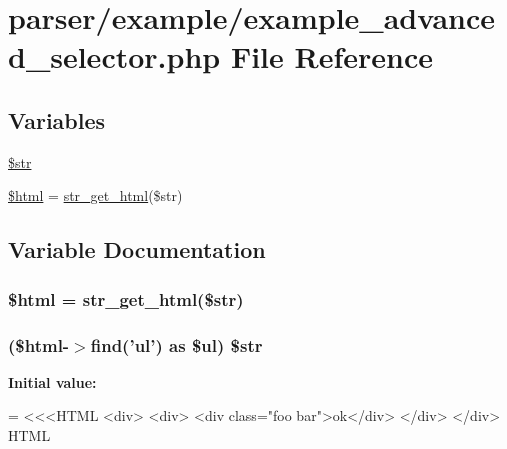 \hypertarget{example__advanced__selector_8php}{\section{parser/example/example\+\_\+advanced\+\_\+selector.php File Reference}
\label{example__advanced__selector_8php}
}
\subsection*{Variables}
\begin{DoxyCompactItemize}
\item 
\hyperlink{example__advanced__selector_8php_a2ea7d17e34a7460258441ecc9ab825ae}{\$str}
\item 
\hyperlink{example__advanced__selector_8php_a6f96e7fc92441776c9d1cd3386663b40}{\$html} = \hyperlink{simple__html__dom_8php_a2a9c7626f0cb0a56eb81709124a08922}{str\+\_\+get\+\_\+html}(\$str)
\end{DoxyCompactItemize}


\subsection{Variable Documentation}
\hypertarget{example__advanced__selector_8php_a6f96e7fc92441776c9d1cd3386663b40}{
\subsubsection[{\$html}]{\setlength{\rightskip}{0pt plus 5cm}\$html = {\bf str\+\_\+get\+\_\+html}(\$str)}}\label{example__advanced__selector_8php_a6f96e7fc92441776c9d1cd3386663b40}
\hypertarget{example__advanced__selector_8php_a2ea7d17e34a7460258441ecc9ab825ae}{
\subsubsection[{\$str}]{ (\$html-\/$>$find('ul') as \$ul) \$str}}\label{example__advanced__selector_8php_a2ea7d17e34a7460258441ecc9ab825ae}
{\bfseries Initial value\+:}
\begin{DoxyCode}
= <<<HTML
<div>
    <div>
        <div \textcolor{keyword}{class}=\textcolor{stringliteral}{"foo bar"}>ok</div>
    </div>
</div>
HTML
\end{DoxyCode}
